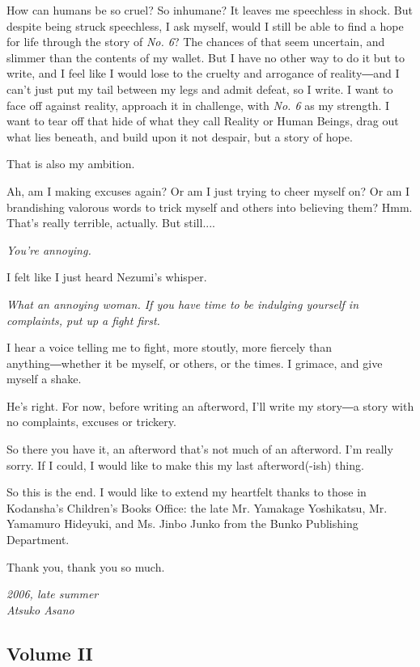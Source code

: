 How can humans be so cruel? So inhumane? It leaves me speechless in
shock. But despite being struck speechless, I ask myself, would I still
be able to find a hope for life through the story of \emph{No. 6}? The chances
of that seem uncertain, and slimmer than the contents of my wallet. But
I have no other way to do it but to write, and I feel like I would lose
to the cruelty and arrogance of reality―and I can't just put my tail
between my legs and admit defeat, so I write. I want to face off against
reality, approach it in challenge, with \emph{No. 6} as my strength. I want to
tear off that hide of what they call Reality or Human Beings, drag out
what lies beneath, and build upon it not despair, but a story of hope.

That is also my ambition.

Ah, am I making excuses again? Or am I just trying to cheer myself on?
Or am I brandishing valorous words to trick myself and others into
believing them? Hmm. That's really terrible, actually. But still....

\emph{You're annoying.}

I felt like I just heard Nezumi's whisper.

\emph{What an annoying woman. If you have time to be indulging yourself
in complaints, put up a fight first.}

I hear a voice telling me to fight, more stoutly, more fiercely than
anything―whether it be myself, or others, or the times. I grimace, and
give myself a shake.

He's right. For now, before writing an afterword, I'll write my story―a
story with no complaints, excuses or trickery.

So there you have it, an afterword that's not much of an afterword. I'm
really sorry. If I could, I would like to make this my last
afterword(-ish) thing.

So this is the end. I would like to extend my heartfelt thanks to those
in Kodansha's Children's Books Office: the late Mr. Yamakage Yoshikatsu,
Mr. Yamamuro Hideyuki, and Ms. Jinbo Junko from the Bunko Publishing
Department.

Thank you, thank you so much.

\myspace

\emph{2006, late summer\\
Atsuko Asano}

\subsection{Volume II}
